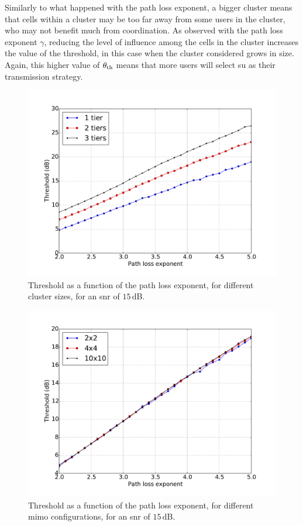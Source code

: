 Similarly to what happened with the path loss exponent, a bigger cluster means
that cells within a cluster may be too far away from some users in the cluster,
who may not benefit much from coordination. As observed with the path loss
exponent $\gamma$, reducing the level of influence among the cells in the
cluster increases the value of the threshold, in this case when the cluster
considered grows in size. Again, this higher value of $\theta_{\text{th}}$ means that more
users will select \gls{su} as their transmission strategy.

\begin{figure}[t]
	\centering
	\includegraphics[width=0.75\columnwidth]{./21.appendices/img/threshold_exp_tiers_02x02_s+0015_r1300}
	\caption{Threshold as a function of the path loss exponent, for different
    cluster sizes, for an \gls{snr} of $15$\,dB.}
	\label{fig:th_exp_tiers}
\end{figure}

\begin{figure}[t]
	\centering
	\includegraphics[width=0.75\columnwidth]{./21.appendices/img/threshold_exp_anten_02x02_t02_i01_r1300}
	\caption{Threshold as a function of the path loss exponent, for different
    \gls{mimo} configurations, for an \gls{snr} of $15$\,dB.}
	\label{fig:th_exp_ant}
\end{figure}

